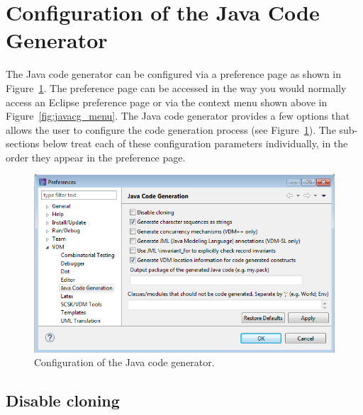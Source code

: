 \section{Configuration of the Java Code Generator}

The Java code generator can be configured via a preference page as
shown in Figure~\ref{fig:javacg_config}. The preference page can be
accessed in the way you would normally access an Eclipse preference
page or via the context menu shown above in
Figure~\ref{fig:javacg_menu}. The Java code generator provides a few
options that allows the user to configure the code generation process
(see Figure~\ref{fig:javacg_config}). The sub-sections below treat
each of these configuration parameters individually, in the order they
appear in the preference page.

\begin{figure}[htbp]
\begin{center}
\includegraphics[width=15cm]{screenDumps/javacg_config}
\caption{Configuration of the Java code generator.\label{fig:javacg_config}}
\end{center}
\end{figure}

\subsection{Disable cloning}

